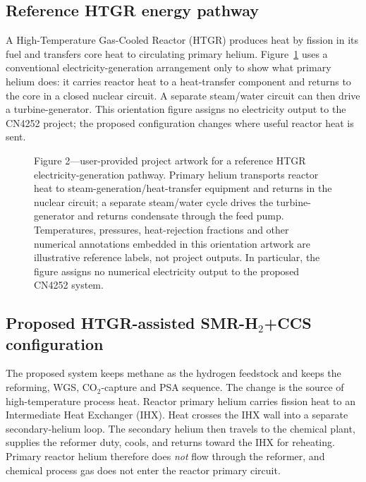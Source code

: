 \subsection{Reference HTGR energy pathway}
A High-Temperature Gas-Cooled Reactor (HTGR) produces heat by fission in its fuel and transfers core heat to circulating primary helium. Figure~\ref{fig:htgr-power-orientation} uses a conventional electricity-generation arrangement only to show what primary helium does: it carries reactor heat to a heat-transfer component and returns to the core in a closed nuclear circuit. A separate steam/water circuit can then drive a turbine-generator. This orientation figure assigns no electricity output to the CN4252 project; the proposed configuration changes where useful reactor heat is sent.

\begin{figure}[htbp]\centering
{}
\caption{Figure 2---user-provided project artwork for a reference HTGR electricity-generation pathway. Primary helium transports reactor heat to steam-generation/heat-transfer equipment and returns in the nuclear circuit; a separate steam/water cycle drives the turbine-generator and returns condensate through the feed pump. Temperatures, pressures, heat-rejection fractions and other numerical annotations embedded in this orientation artwork are illustrative reference labels, not project outputs. In particular, the figure assigns no numerical electricity output to the proposed CN4252 system.}
\label{fig:htgr-power-orientation}
\end{figure}

\subsection{Proposed HTGR-assisted SMR-H$_2$+CCS configuration}
The proposed system keeps methane as the hydrogen feedstock and keeps the reforming, WGS, CO$_2$-capture and PSA sequence. The change is the source of high-temperature process heat. Reactor primary helium carries fission heat to an Intermediate Heat Exchanger (IHX). Heat crosses the IHX wall into a separate secondary-helium loop. The secondary helium then travels to the chemical plant, supplies the reformer duty, cools, and returns toward the IHX for reheating. Primary reactor helium therefore does \emph{not} flow through the reformer, and chemical process gas does not enter the reactor primary circuit.

